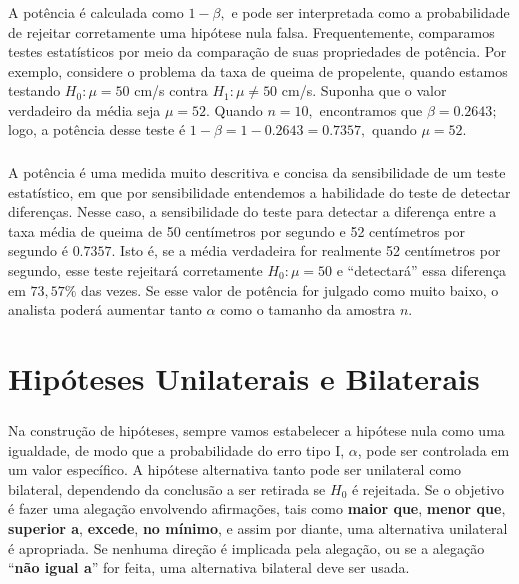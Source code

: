 \documentclass[14pt,aspectratio=1610]{beamer}
\newcommand{\Ho}{\ensuremath{H_{0}}}
\newcommand{\Hi}{\ensuremath{H_{1}}}
\begin{document}
\begin{frame}{}
\frametitle{}
\begin{block}{}
\justifying
A potência é calculada como $1-\beta,$ e pode ser interpretada como a probabilidade de rejeitar corretamente uma hipótese nula falsa. Frequentemente, 
comparamos testes estatísticos por meio da comparação de suas propriedades de potência. Por exemplo, considere o problema da taxa de queima de propelente, quando 
estamos testando $\Ho: \mu = 50$ cm/s contra $\Hi: \mu \neq 50$ cm/s. Suponha que o valor verdadeiro da média seja $\mu = 52.$ Quando $n = 10,$ encontramos 
que $\beta = 0.2643;$ logo, a potência desse teste é $1-\beta = 1 - 0.2643 = 0.7357,$ quando $\mu = 52.$
\end{block}
\end{frame}



\begin{frame}{}
\frametitle{}
\begin{block}{}
\justifying
A potência é uma medida muito descritiva e concisa da sensibilidade de um teste estatístico, em que por sensibilidade entendemos a habilidade do teste de detectar 
diferenças. Nesse caso, a sensibilidade do teste para detectar a diferença entre a taxa média de queima de 50 centímetros por segundo e 52 centímetros por segundo é 
$0.7357.$ Isto é, se a média verdadeira for realmente 52 centímetros por segundo, esse teste rejeitará corretamente $\Ho: \mu = 50$ e ``detectará'' essa diferença em 
$73,57\%$ das vezes. Se esse valor de potência for julgado como muito baixo, o analista poderá aumentar tanto $\alpha$ como o tamanho da amostra $n.$

\end{block}
\end{frame}

\section{Hipóteses Unilaterais e Bilaterais}
\begin{frame}{}
\frametitle{}
\begin{block}{}
\justifying
Na construção de hipóteses, sempre vamos estabelecer a hipótese nula como uma igualdade, de modo que a probabilidade do erro tipo I, $\alpha$, pode ser controlada em 
um valor específico. A hipótese alternativa tanto pode ser unilateral como bilateral, dependendo da conclusão a ser retirada se $\Ho$ é rejeitada. Se o objetivo é fazer uma 
alegação envolvendo afirmações, tais como \textbf{maior que}, \textbf{menor que}, \textbf{superior a},\textbf{ excede}, \textbf{no mínimo}, e assim por diante, uma alternativa 
unilateral é apropriada. Se nenhuma direção é implicada pela alegação, ou se a alegação ``\textbf{não igual a}'' for feita, uma alternativa bilateral deve ser usada.

\end{block}
\end{frame}
\end{document}
